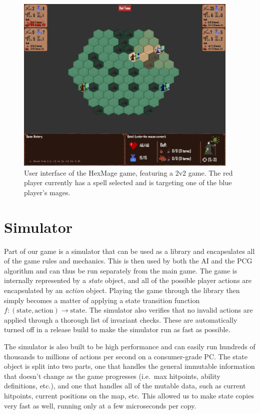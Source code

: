 \begin{figure}[h]
	\centering
	\includegraphics[width=0.95\textwidth]{img/arena.png}
	\caption{User interface of the HexMage game, featuring a 2v2 game. The red player currently has a spell selected and is targeting one of the blue player's mages.}	
	\label{fig:arena}
\end{figure}


\section{Simulator}

Part of our game is a simulator that can be used as a library and encapsulates
all of the game rules and mechanics. This is then used by both the AI and the
PCG algorithm and can thus be run separately from the main game. The game is
internally represented by a \emph{state} object, and all of the possible player
actions are encapsulated by an \emph{action} object.  Playing the game through
the library then simply becomes a matter of applying a state transition
function $f: (\text{state}, \text{action}) \rightarrow \text{state}$. The
simulator also verifies that no invalid actions are applied through a thorough
list of invariant checks. These are automatically turned off in a release build
to make the simulator run as fast as possible.

The simulator is also built to be high performance and can easily run hundreds
of thousands to millions of actions per second on a consumer-grade PC\@.
The state object is split into two parts, one that handles the
general immutable information that doesn't change as the game progresses (i.e.\
max hitpoints, ability definitions, etc.), and one that handles all of the
mutable data, such as current hitpoints, current positions on the map, etc.
This allowed us to make state copies very fast as well, running only at a few
microseconds per copy.

